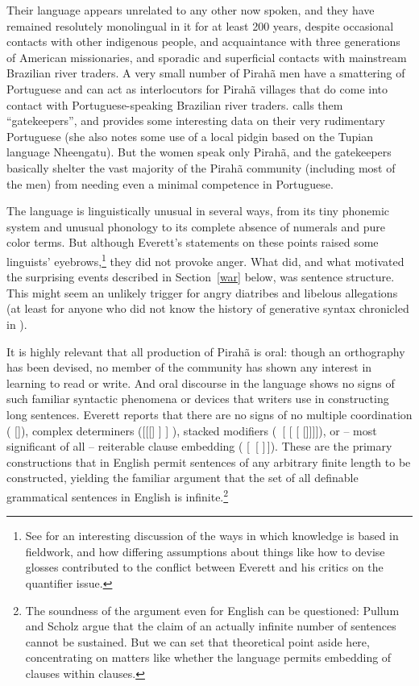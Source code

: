 \documentclass[output=paper,colorlinks,citecolor=brown
]{langscibook}
\begin{document}
Their language appears unrelated to any other now spoken, and they
have remained resolutely monolingual in it for at least 200 years,
despite occasional contacts with other indigenous people, and
acquaintance with three generations of American missionaries, and
sporadic and superficial contacts with mainstream Brazilian river
traders. A very small number of Pirah{\~a} men have a smattering of
Portuguese and can act as interlocutors for Pirah{\~a} villages that
do come into contact with Portuguese-speaking Brazilian river traders.
\citet{Sakel12} calls them ``gatekeepers'', and provides some interesting
data on their very rudimentary Portuguese (she also notes some use
of a local pidgin based on the Tupian language Nheengatu). But the
women speak only Pirah{\~a}, and the gatekeepers basically shelter
the vast majority of the Pirah{\~a} community (including most of the
men) from needing even a minimal competence in Portuguese.

The language is linguistically unusual in several ways, from its tiny
phonemic system and unusual phonology to its complete absence of
numerals and pure color terms. But although Everett's statements on
these points raised some linguists' eyebrows,\footnote{%
   See \citealt{DobrSchw21} for an interesting discussion of the ways
   in which knowledge is based in fieldwork, and how differing assumptions
   about things like how to devise glosses contributed to the conflict
   between Everett and his critics on the quantifier issue.}
they did not provoke anger. What did, and what motivated the surprising
events described in Section~\ref{war} below, was sentence structure.
This might seem an unlikely trigger for angry diatribes and libelous
allegations (at least for anyone who did not know the history of
generative syntax chronicled in \citealt{Harris21}).

It is highly relevant that all production of Pirah{\~a} is oral:
though an orthography has been devised, no member of the community
has shown any interest in learning to read or write. And oral
discourse in the language shows no signs of such familiar syntactic
phenomena or devices that writers use in constructing long sentences.
Everett reports that there are no signs of no multiple coordination
( []),
complex determiners ([[[] ] ]
), stacked modifiers (~[ [
[ []]]]), or -- most significant
of all -- reiterable clause embedding ( [\, [\,\,]\,]). These are the primary
constructions that in English permit sentences of any arbitrary finite
length to be constructed, yielding the familiar argument that the set
of all definable grammatical sentences in English is
infinite.\footnote{%
   The soundness of the argument even for English can be questioned:
   Pullum and Scholz \citeyearpar[115--124]{PullScho10} argue that the
   claim of an actually infinite number of sentences cannot be
   sustained. But we can set that theoretical point aside here,
   concentrating on matters like whether the language permits
   embedding of clauses within clauses.}
\end{document}

